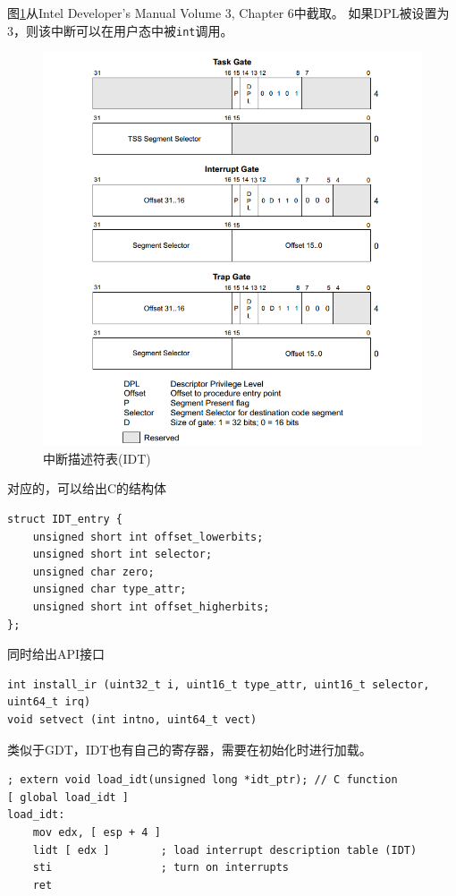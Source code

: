 \documentclass[logo,reportComp]{thesis}
\begin{document}
图\ref{fig:idt}从Intel Developer's Manual Volume 3, Chapter 6中截取。
如果DPL被设置为3，则该中断可以在用户态中被\verb'int'调用。
\begin{figure}[H]
\centering
\includegraphics[width=0.7\linewidth]{fig/idt.PNG}
\caption{中断描述符表(IDT)}
\label{fig:idt}
\end{figure}

对应的，可以给出C的结构体
\begin{lstlisting}
struct IDT_entry {
	unsigned short int offset_lowerbits;
	unsigned short int selector;
	unsigned char zero;
	unsigned char type_attr;
	unsigned short int offset_higherbits;
};
\end{lstlisting}

同时给出API接口
\begin{lstlisting}
int install_ir (uint32_t i, uint16_t type_attr, uint16_t selector, uint64_t irq)
void setvect (int intno, uint64_t vect)
\end{lstlisting}

类似于GDT，IDT也有自己的寄存器，需要在初始化时进行加载。
\begin{lstlisting}[language={[x86masm]Assembler}]
; extern void load_idt(unsigned long *idt_ptr); // C function
[ global load_idt ]
load_idt:
	mov edx, [ esp + 4 ]
	lidt [ edx ]        ; load interrupt description table (IDT)
	sti                 ; turn on interrupts
	ret
\end{lstlisting}
\end{document}
